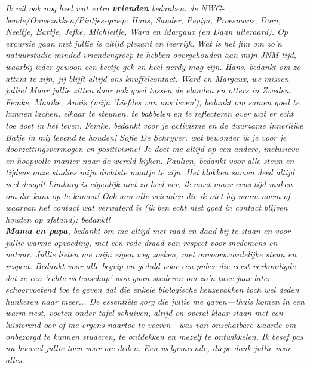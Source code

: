 \documentclass[10pt, twoside]{book} %
\begin{document}
\begin{small}
\textit{Ik wil ook nog heel wat extra \textbf{vrienden} bedanken: de NWG-bende/Ouwezakken/\-Pintjes-groep: Hans, Sander, Pepijn, Proesmans, Dora, Neeltje, Bartje, Jefke, Michieltje, Ward en Margaux (en Daan uiteraard). Op excursie gaan met jullie is altijd plezant en leerrijk. Wat is het fijn om zo'n natuurstudie-minded vriendengroep te hebben overgehouden aan mijn JNM-tijd, waarbij ieder gewoon een beetje gek en heel nerdy mag zijn. Hans, bedankt om zo attent te zijn, jij blijft altijd ons knuffelcontact. Ward en Margaux, we missen jullie! Maar jullie zitten daar ook goed tussen de elanden en otters in Zweden. Femke, Maaike, Ana\"{i}s (mijn `Liefdes van ons leven'), bedankt om samen goed te kunnen lachen, elkaar te steunen, te babbelen en te reflecteren over wat er echt toe doet in het leven. Femke, bedankt voor je activisme en de duurzame innerlijke Batje in mij levend te houden! Sofie De Schryver, wat bewonder ik je voor je doorzettingsvermogen en positivisme! Je doet me altijd op een andere, inclusieve en hoopvolle manier naar de wereld kijken. Paulien, bedankt voor alle steun en tijdens onze studies mijn dichtste maatje te zijn. Het blokken samen deed altijd veel deugd! Limburg is eigenlijk niet zo heel ver, ik moet maar eens tijd maken om die kant op te komen! Ook aan alle vrienden die ik niet bij naam noem of waarvan het contact wat verwaterd is (ik ben echt niet goed in contact blijven houden op afstand): bedankt!}\\
	
\textit{\textbf{Mama en papa}, bedankt om me altijd met raad en daad bij te staan en voor jullie warme opvoeding, met een rode draad van respect voor medemens en natuur. Jullie lieten me mijn eigen weg zoeken, met onvoorwaardelijke steun en respect. Bedankt voor alle begrip en geduld voor een puber die eerst verkondigde dat ze een `echte wetenschap' wou gaan studeren om zo'n twee jaar later schoorvoetend toe te geven dat die enkele biologische keuzevakken toch wel deden hunkeren naar meer... De essenti\"{e}le zorg die jullie me gaven---thuis komen in een warm nest, voeten onder tafel schuiven, altijd en overal klaar staan met een luisterend oor of me ergens naartoe te voeren---was van onschatbare waarde om onbezorgd te kunnen studeren, te ontdekken en mezelf te ontwikkelen. Ik besef pas nu hoeveel jullie toen voor me deden. Een welgemeende, diepe dank jullie voor alles.}\\


\end{small}
\end{document}
